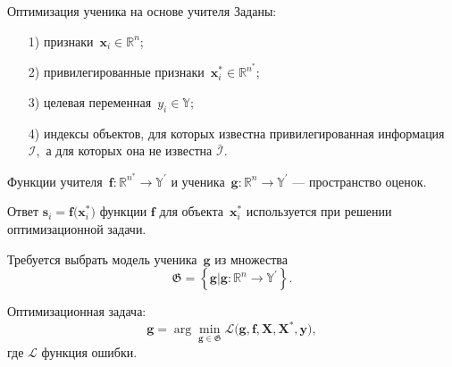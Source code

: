 \documentclass[10pt,pdf,hyperref={unicode}]{beamer}
\begin{document}
\begin{frame}{Оптимизация ученика на основе учителя}
\justifying
Заданы:
\begin{enumerate}
    \item[1)] признаки~$\textbf{x}_i \in \mathbb{R}^{n}$;
    \item[2)] привилегированные признаки~$\textbf{x}^*_i \in \mathbb{R}^{n^*}$;
    \item[3)] целевая переменная~$y_i \in \mathbb{Y}$;
    \item[4)] индексы объектов, для которых известна привилегированная информация $\mathcal{I},$ а для которых она не известна $\bar{\mathcal{I}}$.
\end{enumerate}

\bigskip

Функции учителя~$\textbf{f}:\mathbb{R}^{n^*} \to \mathbb{Y}^\prime$ и ученика~$\textbf{g}:\mathbb{R}^{n} \to \mathbb{Y}^\prime$ --- пространство оценок.

Ответ $\textbf{s}_i = \textbf{f}\bigr(\textbf{x}_i^*\bigr)$ функции $\textbf{f}$ для объекта~$\textbf{x}^*_i$ используется при решении оптимизационной задачи.

\bigskip

Требуется выбрать модель ученика~$\textbf{g}$ из множества
\[
	\mathfrak{G} = \left\{\textbf{g}| \textbf{g}:\mathbb{R}^{n} \to \mathbb{Y}^\prime\right\}.
\]

Оптимизационная задача:
\[
	\textbf{g} = \arg\min_{\textbf{g} \in \mathfrak{G}} \mathcal{L}\bigr(\textbf{g}, \textbf{f}, \textbf{X}, \textbf{X}^{*}, \textbf{y}\bigr),
\]
где $\mathcal{L}$ функция ошибки.
\end{frame}
\end{document}
